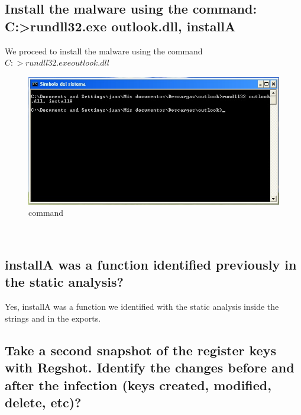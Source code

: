 \documentclass[12pt,letter]{article} %
\begin{document}
        \subsection{Install the malware using the command: C:>rundll32.exe outlook.dll, installA}
            We proceed to install the malware using the command  $ C:>rundll32.exe outlook.dll  $
            \\
            \begin{figure}[h!]
                \centering
                \includegraphics[width=0.5\linewidth]{punto3.jpeg}
                \caption{command}
                \label{command execution:}
            \end{figure}
            \\

        \subsection{installA was a function identified previously in the static
        analysis?}
            Yes, installA was a function we identified with the static analysis
            inside the strings and in the exports.

        \newpage
        \subsection{Take a second snapshot of the register keys with Regshot.
        Identify the changes before and after the infection (keys created,
        modified, delete, etc)?}
\end{document}
